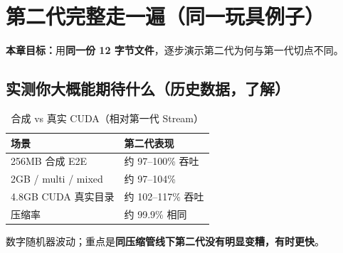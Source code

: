 \chapter{第二代完整走一遍（同一玩具例子）}
\label{ch:gen2-walkthrough}

\noindent\textbf{本章目标：}用\textbf{同一份 12 字节文件}，逐步演示第二代为何与第一代切点不同。



\section{实测你大概能期待什么（历史数据，了解）}

\begin{table}[htbp]
\centering
\caption{合成 vs 真实 CUDA（相对第一代 Stream）}
\small
\begin{tabular}{@{}ll@{}}
\toprule
\textbf{场景} & \textbf{第二代表现} \\
\midrule
256MB 合成 E2E & 约 97--100\% 吞吐 \\
2GB / multi / mixed & 约 97--104\% \\
4.8GB CUDA 真实目录 & 约 102--117\% 吞吐 \\
压缩率 & 约 99.9\% 相同 \\
\bottomrule
\end{tabular}
\end{table}

\noindent 数字随机器波动；重点是\textbf{同压缩管线下第二代没有明显变糟，有时更快}。
